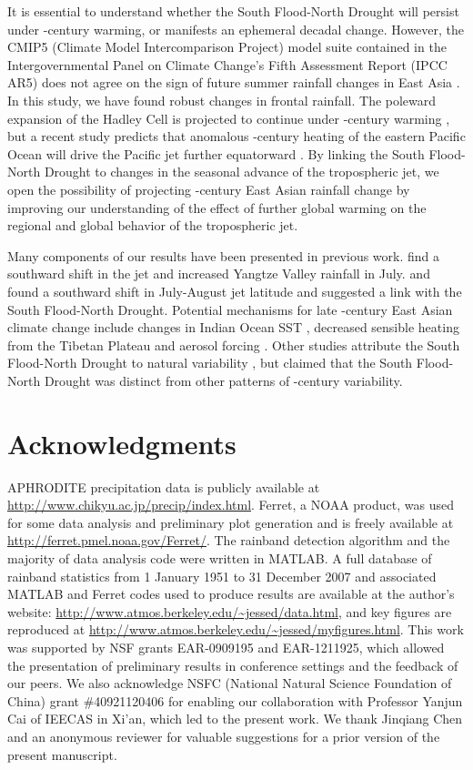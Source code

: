 	It is essential to understand whether the South Flood-North Drought will persist under -century warming, or manifests an ephemeral decadal change. However, the CMIP5 (Climate Model Intercomparison Project) model suite contained in the Intergovernmental Panel on Climate Change's Fifth Assessment Report (IPCC AR5) does not agree on the sign of future summer rainfall changes in East Asia \citep{Christensen2011}. In this study, we have found robust changes in frontal rainfall. The poleward expansion of the Hadley Cell is projected to continue under -century warming \citep{Lu2007,Kang2012}, but a recent study predicts that anomalous -century heating of the eastern Pacific Ocean will drive the Pacific jet further equatorward \citep{Park2014}. By linking the South Flood-North Drought to changes in the seasonal advance of the tropospheric jet, we open the possibility of projecting -century East Asian rainfall change by improving our understanding of the effect of further global warming on the regional and global behavior of the tropospheric jet.
	
	Many components of our results have been presented in previous work. \citet{Xuan2011} find a southward shift in the jet and increased Yangtze Valley rainfall in July. \citet{Yu2004} and \citet{Yu2007} found a southward shift in July-August jet latitude and suggested a link with the South Flood-North Drought. Potential mechanisms for late -century East Asian climate change include changes in Indian Ocean SST \citep{Qu2012}, decreased sensible heating from the Tibetan Plateau \citep{Liu2012a,Hu2015} and aerosol forcing \citep{Song2014}. Other studies attribute the South Flood-North Drought to natural variability \citep{Zhang1999,Xin2006,Lei2014}, but \citet{Zhou2009} claimed that the South Flood-North Drought was distinct from other patterns of -century variability. 


\section{Acknowledgments}

	APHRODITE precipitation data is publicly available at \url{http://www.chikyu.ac.jp/precip/index.html}. Ferret, a NOAA product, was used for some data analysis and preliminary plot generation and is freely available at \url{http://ferret.pmel.noaa.gov/Ferret/}. The rainband detection algorithm and the majority of data analysis code were written in MATLAB. A full database of rainband statistics from 1 January 1951 to 31 December 2007 and associated MATLAB and Ferret codes used to produce results are available at the author's website: \url{http://www.atmos.berkeley.edu/~jessed/data.html}, and key figures are reproduced at \url{http://www.atmos.berkeley.edu/~jessed/myfigures.html}. This work was supported by NSF grants EAR-0909195 and EAR-1211925, which allowed the presentation of preliminary results in conference settings and the feedback of our peers. We also acknowledge NSFC (National Natural Science Foundation of China) grant \#40921120406 for enabling our collaboration with Professor Yanjun Cai of IEECAS in Xi'an, which led to the present work. We thank Jinqiang Chen and an anonymous reviewer for valuable suggestions for a prior version of the present manuscript.
